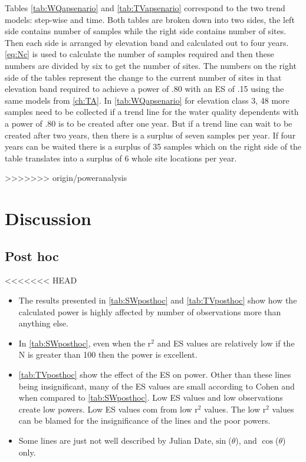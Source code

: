 


Tables \autoref{tab:WQapsenario} and \autoref{tab:TVapsenario} correspond to the two trend models: step-wise and time.
Both tables are broken down into two sides, the left side contains number of samples while the right side contains number of sites.
Then each side is arranged by elevation band and calculated out to four years.
\autoref{eq:Nc} is used to calculate the number of samples required and then these numbers are divided by six to get the number of sites.
The numbers on the right side of the tables represent the change to the current number of sites in that elevation band required to achieve a power of .80 with an ES of .15 using the same models from \autoref{ch:TA}.
In \autoref{tab:WQapsenario} for elevation class 3, 48 more samples need to be collected if a trend line for the water quality dependents with a power of .80 is to be created after one year.  
But if a trend line can wait to be created after two years, then there is a surplus of seven samples per year.  
If four years can be waited there is a surplus of 35 samples which on the right side of the table translates into a surplus of 6 whole site locations per year.

>>>>>>> origin/poweranalysis
\section{Discussion}
\subsection{Post hoc}
<<<<<<< HEAD
\begin{itemize}
	\item The results presented in \autoref{tab:SWposthoc} and \autoref{tab:TVposthoc} show how the calculated power is highly affected by number of observations more than anything else.
	\item In \autoref{tab:SWposthoc}, even when the r$^2$ and ES values are relatively low if the N is greater than 100 then the power is excellent.
	\item \autoref{tab:TVposthoc} show the effect of the ES on power.  Other than these lines being insignificant, many of the ES values are small according to Cohen and when compared to \autoref{tab:SWposthoc}.  Low ES values and low observations create low powers.  Low ES values com from low r$^2$ values.  The low r$^2$ values can be blamed for the insignificance of the lines and the poor powers. 
	\item Some lines are just not well described by Julian Date,$\sin$($\theta$), and $\cos$($\theta$) only.
\end{itemize}
